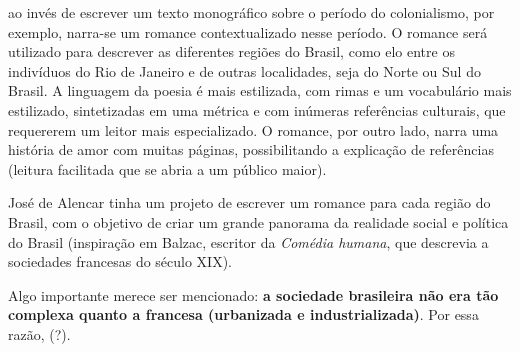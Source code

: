 \documentclass[12pt]{book}
\begin{document}
		\par ao invés de escrever um texto monográfico sobre o período do colonialismo, por exemplo, narra-se um romance contextualizado nesse período. O romance será utilizado para descrever as diferentes regiões do Brasil, como elo entre os indivíduos do Rio de Janeiro e de outras localidades, seja do Norte ou Sul do Brasil. A linguagem da poesia é mais estilizada, com rimas e um vocabulário mais estilizado, sintetizadas em uma métrica e com inúmeras referências culturais, que requererem um leitor mais especializado. O romance, por outro lado, narra uma história de amor com muitas páginas, possibilitando a explicação de referências (leitura facilitada que se abria a um público maior).
		\par José de Alencar tinha um projeto de escrever um romance para cada região do Brasil, com o objetivo de criar um grande panorama da realidade social e política do Brasil (inspiração em Balzac, escritor da \textit{Comédia humana}, que descrevia a sociedades francesas do século XIX).
		\par Algo importante merece ser mencionado: \textbf{a sociedade brasileira não era tão complexa quanto a francesa (urbanizada e industrializada)}. Por essa razão, (?).
\end{document}
